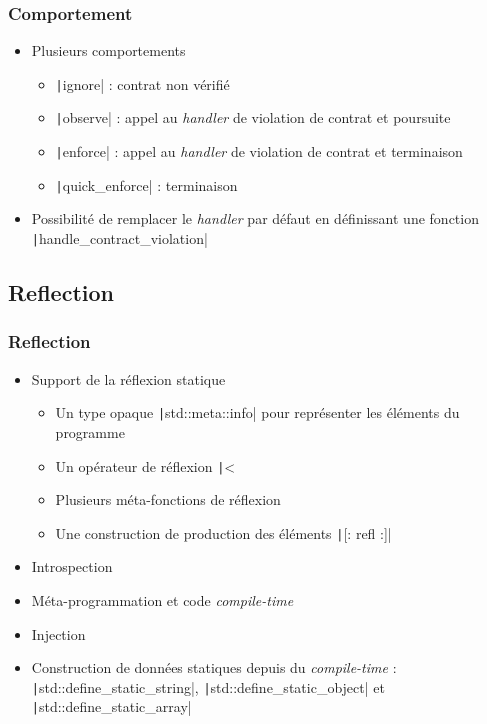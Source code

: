 \documentclass[C++.tex]{subfiles}
\begin{document}
\begin{frame}[fragile]
	\frametitle{Comportement}
	\begin{itemize}
		\item Plusieurs comportements
		\begin{itemize}
			\item \texttt|ignore| : contrat non vérifié
			\item \texttt|observe| : appel au \textit{handler} de violation de contrat et poursuite
			\item \texttt|enforce| : appel au \textit{handler} de violation de contrat et terminaison
			\item \texttt|quick_enforce| : terminaison

		\end{itemize}
		\item Possibilité de remplacer le \textit{handler} par défaut en définissant une fonction \texttt|handle_contract_violation|

	\end{itemize}

\end{frame}

\subsection*{Reflection}
\begin{frame}[fragile]
	\frametitle{Reflection}
	\begin{itemize}
		\item Support de la réflexion statique
		\begin{itemize}
			\item Un type opaque \texttt|std::meta::info| pour représenter les éléments du programme
			\item Un opérateur de réflexion \texttt|^^|
			\item Plusieurs méta-fonctions de réflexion
			\item Une construction de production des éléments \texttt|[: refl :]|
		\end{itemize}
		\item Introspection
		\item Méta-programmation et code \textit{compile-time}
		\item Injection
		\item Construction de données statiques depuis du \textit{compile-time} : \texttt|std::define_static_string|, \texttt|std::define_static_object| et \texttt|std::define_static_array|
	\end{itemize}

\end{frame}
\end{document}
